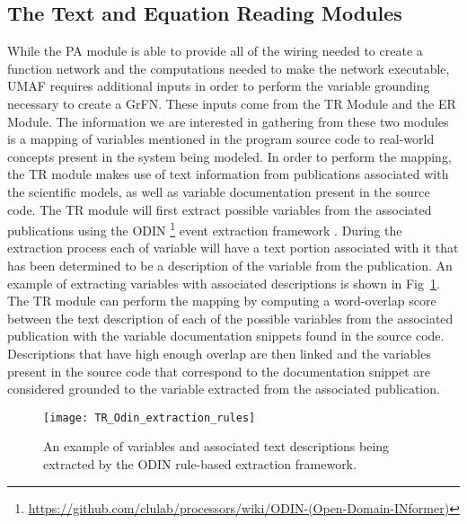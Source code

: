 \subsection{The Text and Equation Reading Modules \label{sec:ter_overview}}
While the PA module is able to provide all of the wiring needed to create a function network and the computations needed to make the network executable, UMAF requires additional inputs in order to perform the variable grounding necessary to create a GrFN.
These inputs come from the TR Module and the ER Module.
The information we are interested in gathering from these two modules is a mapping of variables mentioned in the program source code to real-world concepts present in the system being modeled.
In order to perform the mapping, the TR module makes use of text information from publications associated with the scientific models, as well as variable documentation present in the source code.
The TR module will first extract possible variables from the associated publications using the ODIN \footnote{\url{https://github.com/clulab/processors/wiki/ODIN-(Open-Domain-INformer)}} event extraction framework \citep{valenzuela2015Odin}.
During the extraction process each of variable will have a text portion associated with it that has been determined to be a description of the variable from the publication.
An example of extracting variables with associated descriptions is shown in Fig~\ref{fig:odin_extraction_example}.
The TR module can perform the mapping by computing a word-overlap score between the text description of each of the possible variables from the associated publication with the variable documentation snippets found in the source code.
Descriptions that have high enough overlap are then linked and the variables present in the source code that correspond to the documentation snippet are considered grounded to the variable extracted from the associated publication.

\begin{figure}[!htbp]
    \label{fig:odin_extraction_example}
    \centering
    \texttt{[image: TR\_Odin\_extraction\_rules]}%
    \caption[Example Variable Extraction via ODIN]{An example of variables and associated text descriptions being extracted by the ODIN rule-based extraction framework.}
\end{figure}

